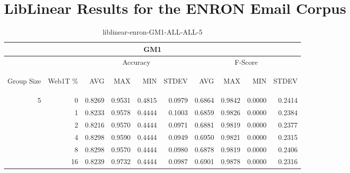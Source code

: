 \chapter{LibLinear Results for the ENRON Email Corpus}
\begin{center}
\begin{table}[htbp]
\begin{tabular}{ | r | r | r | r | r | r | r | r | r | r |}
\hline
\multicolumn{10}{|c|}{GM1}\\
\hline
 & & \multicolumn{4}{|c|}{Accuracy} & \multicolumn{4}{|c|}{F-Score}\\ \cline{3-10}
\begin{sideways}Group Size\end{sideways} & \begin{sideways}Web1T \%\end{sideways} & \begin{sideways}AVG\end{sideways} & \begin{sideways}MAX\end{sideways} & \begin{sideways}MIN\end{sideways} & \begin{sideways}STDEV\end{sideways} & \begin{sideways}AVG\end{sideways} & \begin{sideways}MAX\end{sideways} & \begin{sideways}MIN\end{sideways} & \begin{sideways}STDEV\end{sideways}\\
\hline
\multirow{6}{*}{5}
 & 0 & 0.8269 & 0.9531 & 0.4815 & 0.0979 & 0.6864 & 0.9842 & 0.0000 & 0.2414\\ \cline{2-10}
 & 1 & 0.8233 & 0.9578 & 0.4444 & 0.1003 & 0.6859 & 0.9826 & 0.0000 & 0.2384\\ \cline{2-10}
 & 2 & 0.8216 & 0.9570 & 0.4444 & 0.0971 & 0.6881 & 0.9819 & 0.0000 & 0.2377\\ \cline{2-10}
 & 4 & 0.8298 & 0.9590 & 0.4444 & 0.0949 & 0.6950 & 0.9821 & 0.0000 & 0.2315\\ \cline{2-10}
 & 8 & 0.8298 & 0.9570 & 0.4444 & 0.0980 & 0.6878 & 0.9819 & 0.0000 & 0.2406\\ \cline{2-10}
 & 16 & 0.8239 & 0.9732 & 0.4444 & 0.0987 & 0.6901 & 0.9878 & 0.0000 & 0.2316\\ \cline{2-10}
\hline
\end{tabular}
\caption{liblinear-enron-GM1-ALL-ALL-5}
\end{table}
\end{center}

